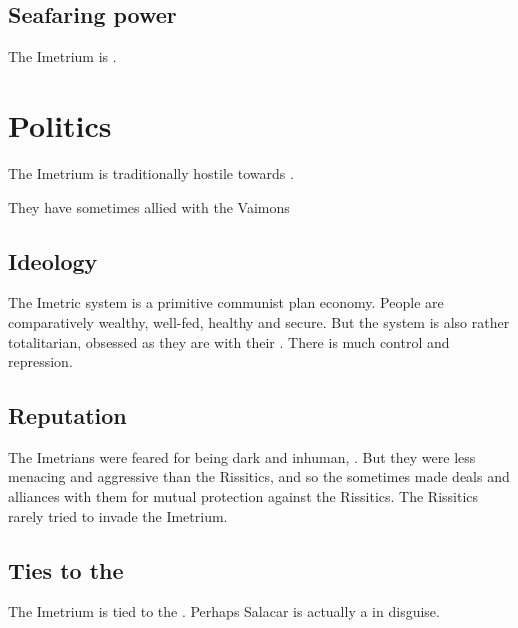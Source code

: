 \subsection{Seafaring power}
The Imetrium is . 















\section{Politics}
The Imetrium is traditionally hostile towards . 

They have sometimes allied with the  Vaimons





\subsection{Ideology}
The Imetric system is a primitive communist plan economy. 
People are comparatively wealthy, well-fed, healthy and secure. 
But the system is also rather totalitarian, obsessed as they are with their . 
There is much control and repression. 





\subsection{Reputation}
The Imetrians were feared for being dark and inhuman, .
But they were less menacing and aggressive than the Rissitics, and so the \Velcadians sometimes made deals and alliances with them for mutual protection against the Rissitics.
The Rissitics rarely tried to invade the Imetrium.





\subsection{Ties to the \nagae}
The Imetrium is tied to the \nagae. 
Perhaps Salacar is actually a \nagalord{} in disguise. 

